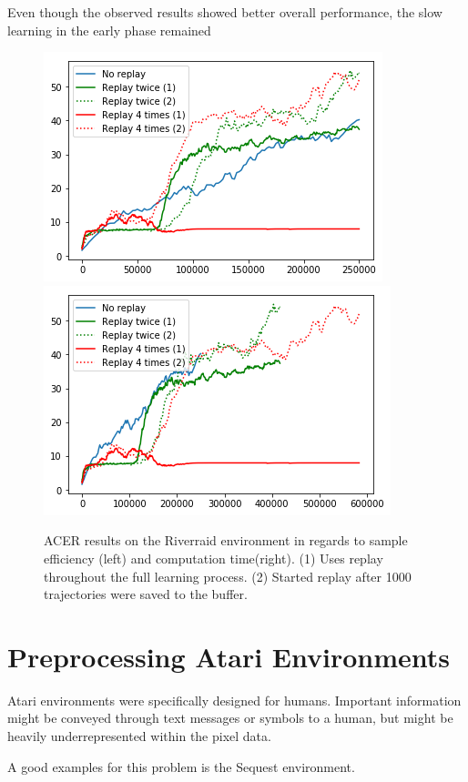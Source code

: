 Even though the observed results showed better overall performance, the slow learning in the early phase remained

\begin{figure}[h]
\includegraphics[scale=0.55]{bilder/riverraidreplayonline.png}
\includegraphics[scale=0.55]{bilder/riverraidreplaytime.png}
\caption{ACER results on the Riverraid environment in regards to sample efficiency (left) and computation time(right). (1) Uses replay throughout the full learning process. (2) Started replay after 1000 trajectories were saved to the buffer.}
\end{figure}

\pagebreak

\section{Preprocessing Atari Environments}

Atari environments were specifically designed for humans. Important information might be conveyed through text messages or symbols to a human, but might be heavily underrepresented within the pixel data.

A good examples for this problem is the Sequest environment. 

